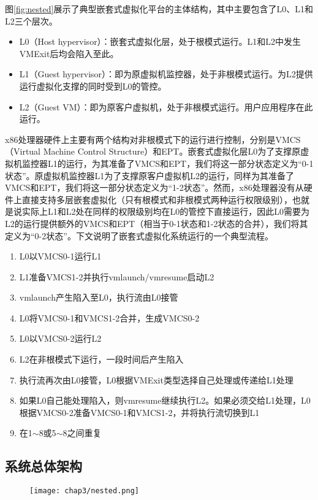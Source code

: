 图\ref{fig:nested}展示了典型嵌套式虚拟化平台的主体结构，其中主要包含了L0、L1和L2三个层次。

\begin{itemize}
\item{L0（Host hypervisor）：嵌套式虚拟化层，处于根模式运行。L1和L2中发生VMExit后均会陷入至此。}
\item{L1（Guest hypervisor）：即为原虚拟机监控器，处于非根模式运行。为L2提供运行虚拟化支撑的同时受到L0的管控。}
\item{L2（Guest VM）：即为原客户虚拟机，处于非根模式运行。用户应用程序在此运行。}
\end{itemize}

x86处理器硬件上主要有两个结构对非根模式下的运行进行控制，分别是VMCS（Virtual Machine Control Structure）和EPT。嵌套式虚拟化层L0为了支撑原虚拟机监控器L1的运行，为其准备了VMCS和EPT，我们将这一部分状态定义为“0-1状态”。原虚拟机监控器L1为了支撑原客户虚拟机L2的运行，同样为其准备了VMCS和EPT，我们将这一部分状态定义为“1-2状态”。然而，x86处理器没有从硬件上直接支持多层嵌套虚拟化（只有根模式和非根模式两种运行权限级别），也就是说实际上L1和L2处在同样的权限级别均在L0的管控下直接运行，因此L0需要为L2的运行提供额外的VMCS和EPT（相当于0-1状态和1-2状态的合并），我们将其定义为“0-2状态”。下文说明了嵌套式虚拟化系统运行的一个典型流程。

\begin{enumerate}
\item L0以VMCS0-1运行L1
\item L1准备VMCS1-2并执行vmlaunch/vmresume启动L2
\item vmlaunch产生陷入至L0，执行流由L0接管
\item L0将VMCS0-1和VMCS1-2合并，生成VMCS0-2
\item L0以VMCS0-2运行L2
\item L2在非根模式下运行，一段时间后产生陷入
\item 执行流再次由L0接管，L0根据VMExit类型选择自己处理或传递给L1处理
\item 如果L0自己能处理陷入，则vmresume继续执行L2。如果必须交给L1处理，L0根据VMCS0-2准备VMCS0-1和VMCS1-2，并将执行流切换到L1
\item 在1$\sim$8或5$\sim$8之间重复
\end{enumerate}

\subsection{系统总体架构}

\begin{figure}[!htp]
  \centering
  \texttt{[image: chap3/nested.png]}
\end{figure}


